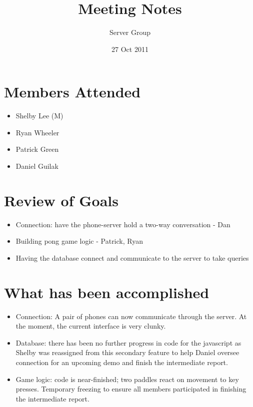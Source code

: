\documentclass[11pt]{article} %
\title{Meeting Notes}
\author{Server Group}
\date{27 Oct 2011} %
\begin{document}
\maketitle

\section{Members Attended}

\begin{itemize}
        \item Shelby Lee (M)
        \item Ryan Wheeler
        \item Patrick Green
        \item Daniel Guilak
\end{itemize}

\section{Review of Goals}

\begin{itemize}
         \item Connection: have the phone-server hold a two-way conversation - Dan
       \item Building pong game logic - Patrick, Ryan
        \item Having the database connect and communicate to the server to take queries


\end{itemize}

\section{What has been accomplished}

\begin{itemize}
        \item Connection: A pair of phones can now communicate through the server. At the moment, the current interface is very clunky. 
	\item Database: there has been no further progress in code for the javascript as Shelby was reassigned from this secondary feature to help Daniel oversee connection for an upcoming demo and finish the intermediate report.
	\item Game logic: code is near-finished; two paddles react on movement to key presses. Temporary freezing to ensure all members participated in finishing the intermediate report.
\end{itemize}
\end{document}
